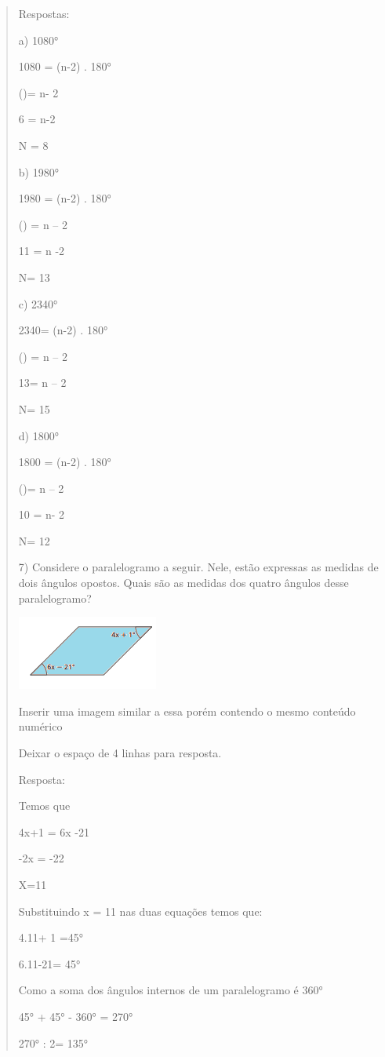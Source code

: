 \begin{quote}
\begin{escolha}
Respostas:

a) 1080°

1080 = (n-2) . 180°

()= n- 2

6 = n-2

N = 8

b) 1980°

1980 = (n-2) . 180°

() = n -- 2

11 = n -2

N= 13

c) 2340°

2340= (n-2) . 180°

() = n -- 2

13= n -- 2

N= 15

d) 1800°

1800 = (n-2) . 180°

()= n -- 2

10 = n- 2

N= 12

7) Considere o paralelogramo a seguir. Nele, estão expressas as medidas
de dois ângulos opostos. Quais são as medidas dos quatro ângulos desse
paralelogramo?

\includegraphics[width=1.82292in,height=0.95833in]{./imgSAEB_8_MAT/media/image9.png}

Inserir uma imagem similar a essa porém contendo o mesmo conteúdo
numérico

Deixar o espaço de 4 linhas para resposta.

Resposta:

Temos que

4x+1 = 6x -21

-2x = -22

X=11

Substituindo x = 11 nas duas equações temos que:

4.11+ 1 =45°

6.11-21= 45°

Como a soma dos ângulos internos de um paralelogramo é 360°

45° + 45° - 360° = 270°

270° : 2= 135°


\end{escolha}
\end{quote}
